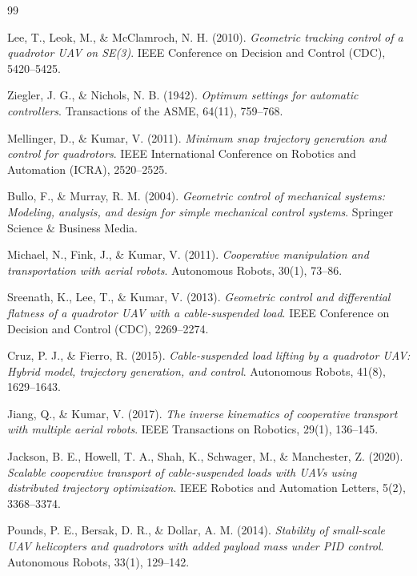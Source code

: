 \documentclass[12pt,a4paper]{article}
\begin{document}
\begin{thebibliography}{99}

Lee, T., Leok, M., \& McClamroch, N. H. (2010).
\textit{Geometric tracking control of a quadrotor UAV on SE(3)}.
IEEE Conference on Decision and Control (CDC), 5420--5425.

Ziegler, J. G., \& Nichols, N. B. (1942).
\textit{Optimum settings for automatic controllers}.
Transactions of the ASME, 64(11), 759--768.

Mellinger, D., \& Kumar, V. (2011).
\textit{Minimum snap trajectory generation and control for quadrotors}.
IEEE International Conference on Robotics and Automation (ICRA), 2520--2525.

Bullo, F., \& Murray, R. M. (2004).
\textit{Geometric control of mechanical systems: Modeling, analysis, and design for simple mechanical control systems}.
Springer Science \& Business Media.

Michael, N., Fink, J., \& Kumar, V. (2011).
\textit{Cooperative manipulation and transportation with aerial robots}.
Autonomous Robots, 30(1), 73--86.

Sreenath, K., Lee, T., \& Kumar, V. (2013).
\textit{Geometric control and differential flatness of a quadrotor UAV with a cable-suspended load}.
IEEE Conference on Decision and Control (CDC), 2269--2274.

Cruz, P. J., \& Fierro, R. (2015).
\textit{Cable-suspended load lifting by a quadrotor UAV: Hybrid model, trajectory generation, and control}.
Autonomous Robots, 41(8), 1629--1643.

Jiang, Q., \& Kumar, V. (2017).
\textit{The inverse kinematics of cooperative transport with multiple aerial robots}.
IEEE Transactions on Robotics, 29(1), 136--145.

Jackson, B. E., Howell, T. A., Shah, K., Schwager, M., \& Manchester, Z. (2020).
\textit{Scalable cooperative transport of cable-suspended loads with UAVs using distributed trajectory optimization}.
IEEE Robotics and Automation Letters, 5(2), 3368--3374.

Pounds, P. E., Bersak, D. R., \& Dollar, A. M. (2014).
\textit{Stability of small-scale UAV helicopters and quadrotors with added payload mass under PID control}.
Autonomous Robots, 33(1), 129--142.

\end{thebibliography}
\end{document}
